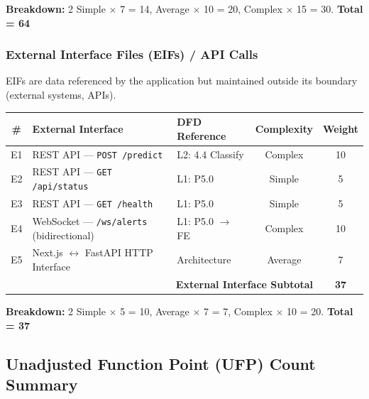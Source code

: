 \documentclass[11pt, a4paper]{article}
\begin{document}
\textbf{Breakdown:} 2 Simple $\times$ 7 = 14,  Average $\times$ 10 = 20,  Complex $\times$ 15 = 30. \quad \textbf{Total = 64}

\subsubsection{External Interface Files (EIFs) / API Calls}
EIFs are data referenced by the application but maintained outside its boundary (external systems, APIs).

\begin{center}
\begin{tabular}{|c|l|l|c|c|}
\hline
\textbf{\#} & \textbf{External Interface} & \textbf{DFD Reference} & \textbf{Complexity} & \textbf{Weight} \\ \hline
E1 & REST API --- \texttt{POST /predict}                     & L2: 4.4 Classify     & Complex  & 10 \\ \hline
E2 & REST API --- \texttt{GET /api/status}                    & L1: P5.0             & Simple   & 5  \\ \hline
E3 & REST API --- \texttt{GET /health}                        & L1: P5.0             & Simple   & 5  \\ \hline
E4 & WebSocket --- \texttt{/ws/alerts} (bidirectional)        & L1: P5.0 $\to$ FE    & Complex  & 10 \\ \hline
E5 & Next.js $\leftrightarrow$ FastAPI HTTP Interface         & Architecture         & Average  & 7  \\ \hline
\multicolumn{4}{|r|}{\textbf{External Interface Subtotal}} & \textbf{37} \\ \hline
\end{tabular}
\end{center}

\textbf{Breakdown:} 2 Simple $\times$ 5 = 10,  Average $\times$ 7 = 7,  Complex $\times$ 10 = 20. \quad \textbf{Total = 37}

\newpage
\subsection{Unadjusted Function Point (UFP) Count Summary}
\end{document}
